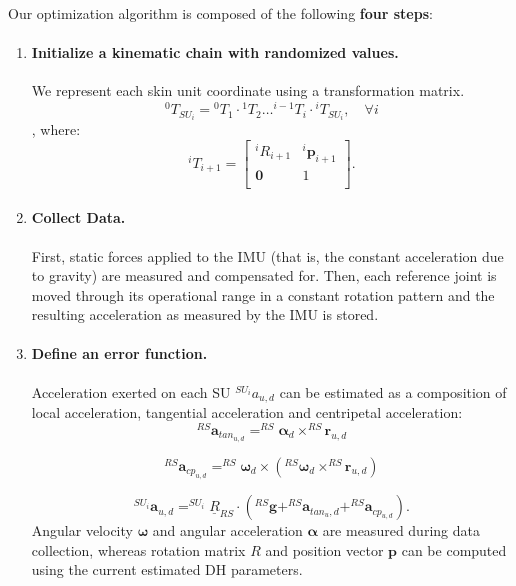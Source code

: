 Our optimization algorithm is composed of the following \textbf{four steps}:

\begin{enumerate}
    \item \paragraph{Initialize a kinematic chain with randomized values.}
    We represent each skin unit coordinate using a transformation matrix.
    $${}^0T_{SU_i} = {}^0T_1 \cdot {}^1T_2 \dots {}^{i-1}T_i \cdot {}^i T_{SU_i}, \quad \forall i$$
    , where:
    $$
    {}^{i}T_{i+1} =
        \left[ \begin{array}{c|c}
            {}^{i}R_{i+1} & {}^{i}\mathbf{p}_{i+1} \\
            \hline
            \mathbf{0} & 1 \\
        \end{array}\right].
    $$

    \item \paragraph{Collect Data.}
    First, static forces applied to the IMU (that is, the constant acceleration due to gravity)
    are measured and compensated for.
    Then, each reference joint is moved through its operational range in a constant rotation pattern
    and the resulting acceleration as measured by the IMU is stored.

    \item \paragraph{Define an error function.}
    Acceleration exerted on each SU ${}^{SU_i}a_{u,d}$ can be estimated as a composition of local acceleration,
    tangential acceleration and centripetal acceleration:
    $$^{RS}\mathbf{a}_{t a n_{u, d}} = ^{R S} \mathbf{\alpha}_{d} \times^{R S} \mathbf{r}_{u, d}$$

    $$^{RS}\mathbf{a}_{cp_{u, d}} = ^{R S} \mathbf{\omega}_{d} \times\left(^{R S} \mathbf{\omega}_{d} \times^{R S} \mathbf{r}_{u, d}\right)$$

    $$^{SU_{i}}\mathbf{a}_{u, d} = ^{SU_{i}}\underline{R}_{R S} \cdot\left(^{R S} \mathbf{g}+^{R S} \mathbf{a}_{t a n_{u}, d}+^{R S} \mathbf{a}_{c p_{u, d}}\right).$$
    Angular velocity $\mathbf{\omega}$ and angular acceleration $\mathbf{\alpha}$ are measured during data collection, whereas rotation matrix $R$ and position vector $\mathbf{p}$ can be computed using the current estimated DH parameters.


\end{enumerate}
